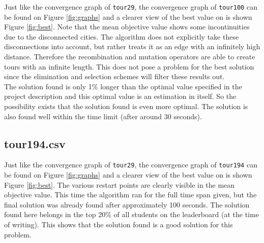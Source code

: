 \documentclass[a4paper,10pt]{article}
\newcommand{\ReplaceMe}[1]{{\color{blue}#1}}
\begin{document}
%
%

Just like the convergence graph of \texttt{tour29}, the convergence graph of \texttt{tour100} can be found on Figure \ref{fig:graphs} and a clearer view of the best value on is shown Figure \ref{fig:best}. Note that the mean objective value shows some incontinuities due to the disconnected cities. The algorithm does not explicitly take these disconnections into account, but rather treats it as an edge with an infinitely high distance. Therefore the recombination and mutation operators are able to create tours with an infinite length. This does not pose a problem for the best solution since the elimination and selection schemes will filter these results out.\\
The solution found is only 1\% longer than the optimal value specified in the project description and this optimal value is an estimation in itself. So the possibility exists that the solution found is even more optimal. The solution is also found well within the time limit (after around 30 seconds). 

\newpage
\subsection{tour194.csv}

%
%

Just like the convergence graph of \texttt{tour29}, the convergence graph of \texttt{tour194} can be found on Figure \ref{fig:graphs} and a clearer view of the best value on is shown Figure \ref{fig:best}. The various restart points are clearly visible in the mean objective value. This time the algorithm ran for the full time span given, but the final solution was already found after approximately 100 seconds. The solution found here belongs in the top 20\% of all students on the leaderboard (at the time of writing). This shows that the solution found is a good solution for this problem.
\end{document}
